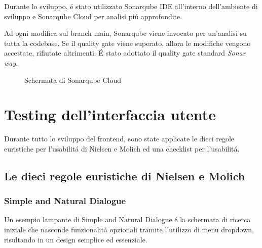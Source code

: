 Durante lo sviluppo, é stato utilizzato Sonarqube IDE all'interno
dell'ambiente di sviluppo e Sonarqube Cloud per analisi piú approfondite.

Ad ogni modifica sul branch main, Sonarqube viene invocato per un'analisi
su tutta la codebase. Se il quality gate viene superato, allora le modifiche
vengono accettate, rifiutate altrimenti.
É stato adottato il quality gate standard \emph{Sonar way}.

\begin{figure}[H]
    \caption{Schermata di Sonarqube Cloud}
    \label{fig:Sonarqube Cloud}
\end{figure}

\section{Testing dell'interfaccia utente}
Durante tutto lo sviluppo del frontend, sono state applicate le dieci regole
euristiche per l'usabilitá di Nielsen e Molich ed una checklist per l'usabilitá.

\subsection{Le dieci regole euristiche di Nielsen e Molich}

\subsubsection{Simple and Natural Dialogue}
Un esempio lampante di Simple and Natural Dialogue é la schermata di ricerca 
iniziale che nasconde funzionalità opzionali tramite l'utilizzo di menu dropdown,
risultando in un design semplice ed essenziale.

